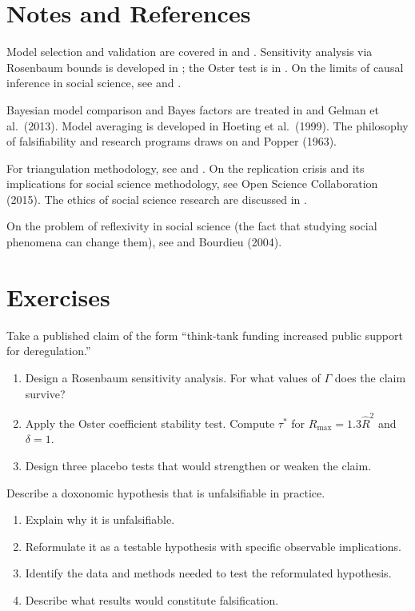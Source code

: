 \section{Notes and References}
\label{sec:ch20-notes}

Model selection and validation are covered in \textcite{freedman2009} and \textcite{gelman2020}.
Sensitivity analysis via Rosenbaum bounds is developed in \textcite{rosenbaum2002}; the Oster test is in \textcite{oster2019}.
On the limits of causal inference in social science, see \textcite{manski1993} and \textcite{imbens2015}.

Bayesian model comparison and Bayes factors are treated in \textcite{kass1995} and Gelman et al.\ (2013).
Model averaging is developed in Hoeting et al.\ (1999).
The philosophy of falsifiability and research programs draws on \textcite{lakatos1978} and Popper (1963).

For triangulation methodology, see \textcite{king1994} and \textcite{morgan2015}.
On the replication crisis and its implications for social science methodology, see Open Science Collaboration (2015).
The ethics of social science research are discussed in \textcite{salganik2018}.

On the problem of reflexivity in social science (the fact that studying social phenomena can change them), see \textcite{hacking1999} and Bourdieu (2004).

\section{Exercises}

\begin{exercise}
Take a published claim of the form ``think-tank funding increased public support for deregulation.''
\begin{enumerate}[nosep]
  \item Design a Rosenbaum sensitivity analysis. For what values of $\Gamma$ does the claim survive?
  \item Apply the Oster coefficient stability test. Compute $\tau^*$ for $R_{\max} = 1.3\hat{R}^2$ and $\delta = 1$.
  \item Design three placebo tests that would strengthen or weaken the claim.
\end{enumerate}
\end{exercise}

\begin{exercise}
Describe a doxonomic hypothesis that is unfalsifiable in practice.
\begin{enumerate}[nosep]
  \item Explain why it is unfalsifiable.
  \item Reformulate it as a testable hypothesis with specific observable implications.
  \item Identify the data and methods needed to test the reformulated hypothesis.
  \item Describe what results would constitute falsification.
\end{enumerate}
\end{exercise}

